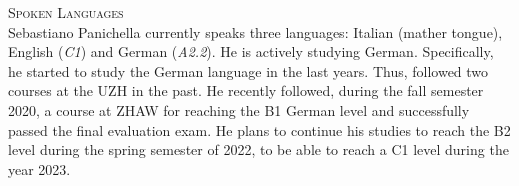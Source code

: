 \documentclass[12pt]{article}
\newcommand{\blankline}{\quad\pagebreak[3]}
\newcommand{\halfblankline}{\quad\vspace{-0.5\baselineskip}\pagebreak[3]}
\begin{document}
\vspace{3.5mm}

\textsc{Spoken Languages}\\

Sebastiano Panichella currently speaks three languages: Italian (mather tongue), English (\textit{C1}) and German (\textit{A2.2}). He is actively studying German. Specifically, he started to study the German language in the last years. Thus, followed two courses at the UZH in the past. He recently followed, during the fall semester 2020, a course at ZHAW for reaching the B1 German level and successfully passed the final evaluation exam. He plans to continue his studies to reach the B2 level during the spring semester of 2022, to be able to reach a C1 level during the year 2023.


\halfblankline
\blankline
\end{document}
